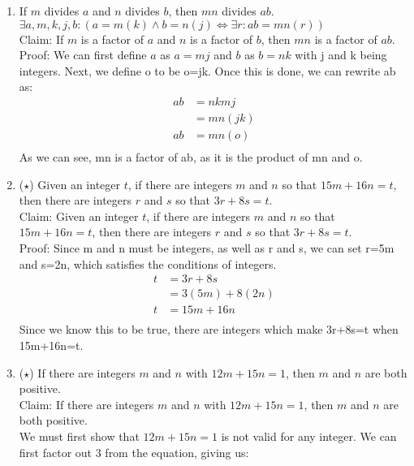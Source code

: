 \documentclass{letter}
\theoremstyle{definition}
\begin{document}
\begin{description}
\begin{enumerate}
		\item If $m$ divides $a$ and $n$ divides $b$, then $mn$ divides $ab$. \\
$ \exists a,m,k,j,b: (a=m(k) \wedge b=n(j) \Leftrightarrow \exists r: ab=mn(r))$ \\
Claim: If $m$ is a factor of $a$ and $n$ is a factor of $b$, then $mn$ is a factor of $ab$.
Proof: We can first define $a$ as $a=mj$ and $b$ as $b=nk$ with j and k being integers. Next, we define o to be o=jk. Once this is done, we can rewrite ab as: \\
\begin{align*}
ab&=nkmj \\
&=mn(jk) \\
ab &= mn(o) \tag{substitute jk for o} \\
\end{align*}
As we can see, mn is a factor of ab, as it is the product of mn and o. \\
                \item ($\star$)  Given an integer $t$, if there are integers $m$ and $n$ so that $15m+16n=t$, then there are integers $r$ and $s$ so that $3r+8s=t$. \\
Claim:  Given an integer $t$, if there are integers $m$ and $n$ so that $15m+16n=t$, then there are integers $r$ and $s$ so that $3r+8s=t$. \\
Proof: Since m and n must be integers, as well as r and s, we can set r=5m and s=2n, which satisfies the conditions of integers. \\
\begin{align*}
t &= 3r + 8s \\
&= 3(5m)+8(2n) \tag{plugged in values of r and s} \\
t &= 15m +16n \tag{Solved for the values above} \\
\end{align*}
Since we know this to be true, there are integers which make 3r+8s=t when 15m+16n=t. \\
		\item ($\star$) If there are integers $m$ and $n$ with $12m+15n=1$, then $m$ and $n$ are both positive. \\
Claim: If there are integers $m$ and $n$ with $12m+15n=1$, then $m$ and $n$ are both positive. \\
We must first show that $12m+15n=1$ is not valid for any integer. We can first factor out 3 from the equation, giving us: \\
\begin{align*}

\end{align*}
\end{enumerate}
\end{description}
\end{document}
